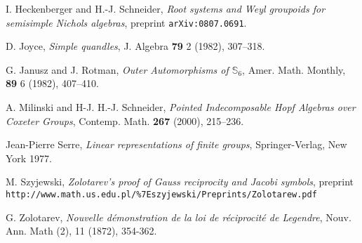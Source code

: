 \documentclass[11pt]{amsart} \textheight 22cm
\renewcommand{\^}[1]{\mbox{$^{\left( #1 \right)}$}}
\renewcommand{\_}[1]{\mbox{$_{\left( #1 \right)}$}}
\theoremstyle{plain}
\theoremstyle{definition}
\theoremstyle{remark}
\newcommand\s{\mathbb S}
\theoremstyle{remark}
\begin{document}
\begin{thebibliography}{AFGV}
 I. Heckenberger and H.-J. Schneider,
\emph{Root systems and Weyl groupoids for semisimple Nichols
algebras}, preprint \texttt{arXiv:0807.0691}.




 D. Joyce,
    \emph{Simple quandles}, J. Algebra \textbf{79} 2 (1982), 307--318.



    G. Janusz and J. Rotman, \emph{Outer Automorphisms of $\s_6$},
    Amer. Math. Monthly, {\bf 89} 6 (1982), 407--410.



 A. Milinski and H-J.  H.-J. Schneider, \emph{Pointed
Indecomposable Hopf Algebras over Coxeter Groups}, Contemp. Math.
\textbf{267} (2000), 215--236.


 Jean-Pierre Serre, \emph{Linear representations of finite groups},
    Springer-Verlag, New York 1977.


 M. Szyjewski, \emph{Zolotarev's proof of Gauss reciprocity and Jacobi
symbols}, preprint
\texttt{http://www.math.us.edu.pl/\%7Eszyjewski/Preprints/Zolotarew.pdf}

 G. Zolotarev, \emph{Nouvelle d\'emonstration de la loi de
 r\'eciprocit\'e de Legendre}, Nouv. Ann. Math (2), 11 (1872), 354-362.



\end{thebibliography}
\end{document}
